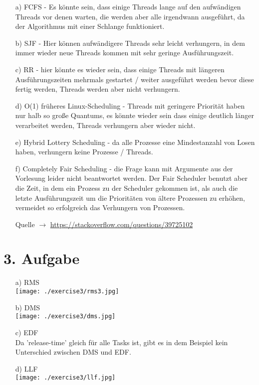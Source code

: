 \begin{enumerate}

\item[a)]
FCFS - Es könnte sein, dass einige Threads lange auf den aufwändigen Threads vor denen warten, die werden aber alle irgendwann ausgeführt, da der Algorithmus mit einer Schlange funktioniert.

\item[b)]
SJF - Hier können aufwändigere Threads sehr leicht verhungern, in dem immer wieder neue Threads kommen mit sehr geringe Ausführungszeit.

\item[c)]
RR - hier könnte es wieder sein, dass einige Threads mit längeren Ausführungszeiten mehrmals gestartet / weiter ausgeführt werden bevor diese fertig werden, Threads werden aber nicht verhungern.

\item[d)]
O(1) früheres Linux-Scheduling - Threads mit geringere Priorität haben nur halb so große Quantums, es könnte wieder sein dass einige deutlich länger verarbeitet werden, Threads verhungern aber wieder nicht.

\item[e)]
Hybrid Lottery Scheduling - da alle Prozesse eine Mindestanzahl von Losen haben, verhungern keine Prozesse / Threads.

\item[f)]
Completely Fair Scheduling - die Frage kann mit Argumente aus der Vorlesung leider nicht beantwortet werden. Der Fair Scheduler benutzt aber die Zeit, in dem ein Prozess zu der Scheduler gekommen ist, als auch die letzte Ausführungszeit um die Prioritäten von ältere Prozessen zu erhöhen, vermeidet so erfolgreich das Verhungern von Prozessen.

Quelle $\rightarrow$ \url{https://stackoverflow.com/questions/39725102}

\end{enumerate}

\section*{3. Aufgabe}

\begin{enumerate}

\item[a)] RMS \\
\texttt{[image: ./exercise3/rms3.jpg]} \\ \clearpage
\item[b)] DMS \\
\texttt{[image: ./exercise3/dms.jpg]} 
\item[c)] EDF \\
Da 'release-time' gleich für alle Tasks ist, gibt es in dem Beispiel kein Unterschied zwischen DMS und EDF. \clearpage
\item[d)] LLF \\
\texttt{[image: ./exercise3/llf.jpg]} 

\end{enumerate}

